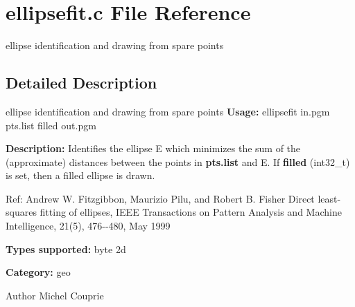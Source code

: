 \section{ellipsefit.c File Reference}
\label{ellipsefit_8c}


ellipse identification and drawing from spare points  




\subsection{Detailed Description}
ellipse identification and drawing from spare points {\bfseries Usage:} ellipsefit in.pgm pts.list filled out.pgm

{\bfseries Description:} Identifies the ellipse E which minimizes the sum of the (approximate) distances between the points in {\bfseries pts.list} and E. If {\bfseries filled} (int32\_\-t) is set, then a filled ellipse is drawn.

Ref: Andrew W. Fitzgibbon, Maurizio Pilu, and Robert B. Fisher Direct least-\/squares fitting of ellipses, IEEE Transactions on Pattern Analysis and Machine Intelligence, 21(5), 476-\/-\/480, May 1999

{\bfseries Types supported:} byte 2d

{\bfseries Category:} geo

\begin{DoxyAuthor}{Author}
Michel Couprie 
\end{DoxyAuthor}
